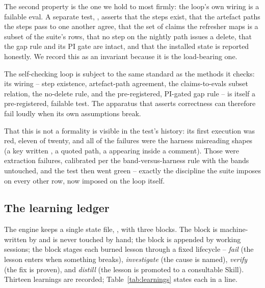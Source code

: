 The second property is the one we hold to most firmly: the loop's own wiring is a
failable eval. A separate test, , asserts
that the steps exist, that the artefact paths the steps pass to one another agree,
that the set of claims the refresher maps is a subset of the suite's rows, that no
step on the nightly path issues a delete, that the gap rule and its PI gate are
intact, and that the installed state is reported honestly. We record this as an
invariant because it is the load-bearing one.

\begin{invariant}
\label{inv:self}
The self-checking loop is subject to the same standard as the methods it checks:
its wiring -- step existence, artefact-path agreement, the claims-to-evals
subset relation, the no-delete rule, and the pre-registered, PI-gated gap rule
-- is itself a pre-registered, failable test. The apparatus that asserts
correctness can therefore fail loudly when its own assumptions break.
\end{invariant}

\noindent That this is not a formality is visible in the test's history: its first
execution was red, eleven of twenty, and all of the failures were the harness
misreading shapes (a  key written , a quoted path, a
 appearing inside a comment). Those were extraction failures,
calibrated per the band-versus-harness rule with the bands untouched, and the
test then went green -- exactly the discipline the suite imposes on every other
row, now imposed on the loop itself.

\subsection{The learning ledger}
\label{sec:verification-ledger}

The engine keeps a single state file, , with three blocks. The
 block is machine-written by  and is never
touched by hand; the  block is appended by working sessions; the
 block stages each burned lesson through a fixed lifecycle --
\emph{fail} (the lesson enters when something breaks), \emph{investigate} (the
cause is named), \emph{verify} (the fix is proven), and \emph{distill} (the lesson
is promoted to a consultable Skill). Thirteen learnings are recorded;
Table~\ref{tab:learnings} states each in a line.

